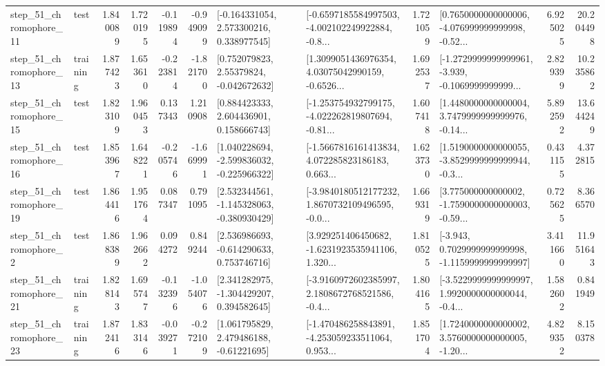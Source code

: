 \begin{tabular}{llrrrrllrlrr}
   step\_51\_chromophore\_11 &      test &      1.840089 &    1.720195 &     -0.119894 & -0.949099 &    [-0.164331054, 2.573300216, 0.338977545] &  [-0.6597185584997503, -4.002102249922884, -0.8... &       1.721059 &  [0.7650000000000006, -4.076999999999998, -0.52... &            6.925025 &         20.204498 \\
   step\_51\_chromophore\_13 &  training &      1.877423 &    1.653610 &     -0.223814 & -1.821700 &     [0.752079823, 2.55379824, -0.042672632] &  [1.3099051436976354, 4.03075042990159, -0.6526... &       1.692537 &  [-1.2729999999999961, -3.939, -0.1069999999999... &            2.829399 &         10.235862 \\
   step\_51\_chromophore\_15 &      test &      1.823109 &    1.960453 &      0.137343 &  1.210908 &     [0.884423333, 2.604436901, 0.158666743] &  [-1.253754932799175, -4.022262819807694, -0.81... &       1.607418 &  [1.4480000000000004, 3.7479999999999976, -0.14... &            5.892592 &         13.644249 \\
   step\_51\_chromophore\_16 &      test &      1.853967 &    1.648221 &     -0.205746 & -1.669991 &   [1.040228694, -2.599836032, -0.225966322] &  [-1.5667816161413834, 4.072285823186183, 0.663... &       1.623730 &  [1.5190000000000055, -3.8529999999999944, -0.3... &            0.431155 &          4.372815 \\
   step\_51\_chromophore\_19 &      test &      1.864416 &    1.951764 &      0.087347 &  0.791095 &   [2.532344561, -1.145328063, -0.380930429] &  [-3.9840180512177232, 1.8670732109496595, -0.0... &       1.669319 &  [3.775000000000002, -1.7590000000000003, -0.59... &            0.725625 &          8.366570 \\
    step\_51\_chromophore\_2 &      test &      1.868389 &    1.962662 &      0.094272 &  0.849244 &    [2.536986693, -0.614290633, 0.753746716] &  [3.929251406450682, -1.6231923535941106, 1.320... &       1.810525 &  [-3.943, 0.7029999999999998, -1.1159999999999997] &            3.411660 &         11.951643 \\
   step\_51\_chromophore\_21 &  training &      1.828143 &    1.695747 &     -0.132396 & -1.054076 &    [2.341282975, -1.304429207, 0.394582645] &  [-3.9160972602385997, 2.1808672768521586, -0.4... &       1.804165 &  [-3.5229999999999997, 1.9920000000000044, -0.4... &            1.582602 &          0.841949 \\
   step\_51\_chromophore\_23 &  training &      1.872416 &    1.833146 &     -0.039271 & -0.272109 &     [1.061795829, 2.479486188, -0.61221695] &  [-1.470486258843891, -4.253059233511064, 0.953... &       1.851704 &  [1.7240000000000002, 3.5760000000000005, -1.20... &            4.829352 &          8.150378 \\

\end{tabular}
